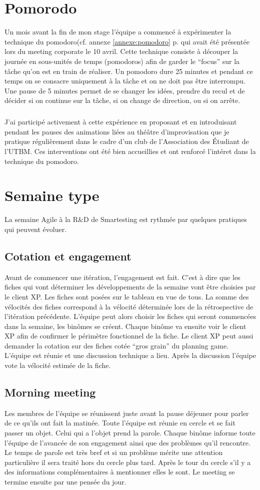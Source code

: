 \section{Pomorodo}
Un mois avant la fin de mon stage l'équipe a commencé à expérimenter la technique du pomodoro(cf. annexe \ref{annexe:pomodoro} p.\pageref{annexe:pomodoro} qui avait été présentée lors du meeting corporate le 10 avril. Cette technique consiste à découper la journée en sous-unités de temps (pomodoros) afin de garder le ``focus'' sur la tâche qu'on est en train de réaliser. Un pomodoro dure 25 minutes et pendant ce temps on se consacre uniquement à la tâche et on ne doit pas être interrompu. Une pause de 5 minutes permet de se changer les idées, prendre du recul et de décider si on continue sur la tâche, si on change de direction, ou si on arrête.
\subparagraph*{}
J'ai participé activement à cette expérience en proposant et en introduisant pendant les pauses des animations liées au théâtre d'improvisation que je pratique régulièrement dans le cadre d'un club de l'Association des Étudiant de l'UTBM. Ces interventions ont été bien accueillies et ont renforcé l'intéret dans la technique du pomodoro.
\section{Semaine type}
La semaine Agile à la R\&D de Smartesting est rythmée par quelques pratiques qui peuvent évoluer.
\subsection*{Cotation et engagement}
Avant de commencer une itération, l'engagement est fait. C'est à dire que les fiches qui vont déterminer les développements de la semaine vont être choisies par le client XP. Les fiches sont posées sur le tableau en vue de tous. La somme des vélocités des fiches correspond à la vélocité déterminée lors de la rétrospective de l'itération précédente. L'équipe peut alors choisir les fiches qui seront commencées dans la semaine, les binômes se créent. Chaque binôme va ensuite voir le client XP afin de confirmer le périmètre fonctionnel de la fiche. Le client XP peut aussi demander la cotation sur des fiches cotée ``gros grain'' du planning game. L'équipe est réunie et une discussion technique a lieu. Après la discussion l'équipe vote la vélocité estimée de la fiche. 
\subsection*{Morning meeting}
Les membres de l'équipe se réunissent juste avant la pause déjeuner pour parler de ce qu'ils ont fait la matinée. Toute l'équipe est réunie en cercle et se fait passer un objet. Celui qui a l'objet prend la parole. Chaque binôme informe toute l'équipe de l'avancée de son engagement ainsi que des problèmes qu'il rencontre. Le temps de parole est très bref et si un problème mérite une attention particulière il sera traité hors du cercle plus tard. Après le tour du cercle s'il y a des informations complémentaires à mentionner elles le sont. Le meeting se termine ensuite par une pensée du jour.

